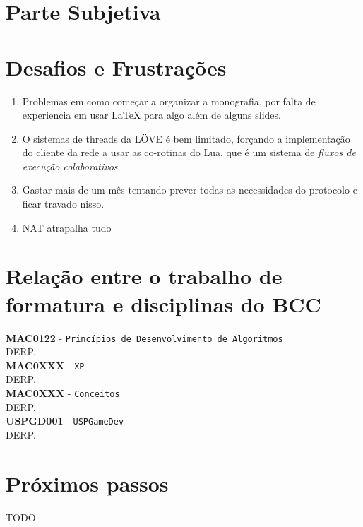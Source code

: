 \chapter*{Parte Subjetiva}
\label{sec:parte_subjetiva}

\chapter{Desafios e Frustrações}
\label{sec:desafios_frustracoes}

  \begin{enumerate}
    \item Problemas em como começar a organizar a monografia, por falta de experiencia em
      usar LaTeX para algo além de alguns slides.
    
    \item O sistemas de threads da LÖVE é bem limitado, forçando a implementação do cliente da rede a usar
      as co-rotinas do Lua, que é um sistema de \textit{fluxos de execução colaborativos}.
    
    \item Gastar mais de um mês tentando prever todas as necessidades do protocolo e ficar travado nisso.
    
    \item NAT atrapalha tudo
  \end{enumerate}

\chapter{Relação entre o trabalho de formatura e disciplinas do BCC}
\label{sec:relacao_disciplinas_bcc}
\newcommand\materia[3]{\noindent \textbf{#1} - \texttt{#2}\\\indent #3\vspace{0.5cm}\\}

\materia{MAC0122}{Princípios de Desenvolvimento de Algoritmos}{
    DERP.
}
\materia{MAC0XXX}{XP}{
    DERP.
}
\materia{MAC0XXX}{Conceitos}{
    DERP.
}
\materia{USPGD001}{USPGameDev}{
    DERP.
}

\chapter{Próximos passos}
\label{sec:proximos_passos}

TODO
